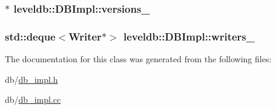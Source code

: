 \subsubsection[{versions\+\_\+}]{$\ast$ leveldb\+::\+D\+B\+Impl\+::versions\+\_\+\hspace{0.3cm}{\ttfamily [private]}}\label{classleveldb_1_1_d_b_impl_a2de2ccb92789a687ba89765f39ec3b2f}
\hypertarget{classleveldb_1_1_d_b_impl_a6f810e4d78d7cae052c365dfd3ceea7f}{}
\subsubsection[{writers\+\_\+}]{\setlength{\rightskip}{0pt plus 5cm}std\+::deque$<${\bf Writer}$\ast$$>$ leveldb\+::\+D\+B\+Impl\+::writers\+\_\+\hspace{0.3cm}{\ttfamily [private]}}\label{classleveldb_1_1_d_b_impl_a6f810e4d78d7cae052c365dfd3ceea7f}


The documentation for this class was generated from the following files\+:\begin{DoxyCompactItemize}
\item 
db/\hyperlink{db__impl_8h}{db\+\_\+impl.\+h}\item 
db/\hyperlink{db__impl_8cc}{db\+\_\+impl.\+cc}\end{DoxyCompactItemize}
